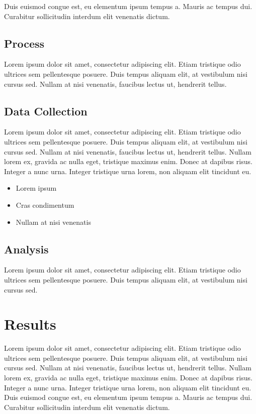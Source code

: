 \documentclass[11pt, a4paper]{resources/JTH}
\begin{document}
        Duis euismod congue est, eu elementum ipsum tempus a. Mauris ac tempus dui. Curabitur sollicitudin interdum elit venenatis dictum. \citep{beck2003test}

    \subsection{Process}
    
        Lorem ipsum dolor sit amet, consectetur adipiscing elit. Etiam tristique odio ultrices sem pellentesque posuere. Duis tempus aliquam elit, at vestibulum nisi cursus sed. Nullam at nisi venenatis, faucibus lectus ut, hendrerit tellus.

    \subsection{Data Collection}
    
        Lorem ipsum dolor sit amet, consectetur adipiscing elit. Etiam tristique odio ultrices sem pellentesque posuere. Duis tempus aliquam elit, at vestibulum nisi cursus sed. Nullam at nisi venenatis, faucibus lectus ut, hendrerit tellus. Nullam lorem ex, gravida ac nulla eget, tristique maximus enim. Donec at dapibus risus. Integer a nunc urna. Integer tristique urna lorem, non aliquam elit tincidunt eu.
        
        \begin{itemize}
            \item Lorem ipsum
            \item Cras condimentum
            \item Nullam at nisi venenatis
        \end{itemize}

    \subsection{Analysis}
    
        Lorem ipsum dolor sit amet, consectetur adipiscing elit. Etiam tristique odio ultrices sem pellentesque posuere. Duis tempus aliquam elit, at vestibulum nisi cursus sed.

\section{Results}

    Lorem ipsum dolor sit amet, consectetur adipiscing elit. Etiam tristique odio ultrices sem pellentesque posuere. Duis tempus aliquam elit, at vestibulum nisi cursus sed. Nullam at nisi venenatis, faucibus lectus ut, hendrerit tellus. Nullam lorem ex, gravida ac nulla eget, tristique maximus enim. Donec at dapibus risus. Integer a nunc urna. Integer tristique urna lorem, non aliquam elit tincidunt eu. Duis euismod congue est, eu elementum ipsum tempus a. Mauris ac tempus dui. Curabitur sollicitudin interdum elit venenatis dictum.
\end{document}
